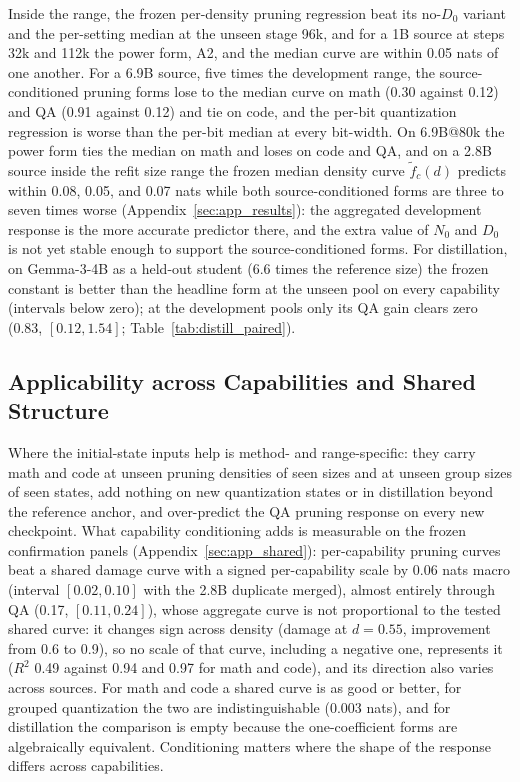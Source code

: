 Inside the range, the frozen per-density pruning regression beat its
no-$D_0$ variant and the per-setting median at the unseen stage 96k,
and for a 1B source at steps 32k and 112k the power form, A2, and the
median curve are within 0.05 nats of one another. For a 6.9B source, five times the development range, the
source-conditioned pruning forms lose to the median curve on math
(0.30 against 0.12) and QA (0.91 against 0.12) and tie on code, and
the per-bit quantization regression is worse than the per-bit median
at every bit-width. On 6.9B@80k the power form ties the median on math and loses on code
and QA, and on a 2.8B source inside the refit size range the frozen
median density curve $\widetilde f_c(d)$ predicts within 0.08, 0.05,
and 0.07 nats while both source-conditioned forms are three to seven
times worse (Appendix~\ref{sec:app_results}): the aggregated
development response is the more accurate predictor there, and the
extra value of $N_0$ and $D_0$ is not yet stable enough to support the
source-conditioned forms. For distillation, on Gemma-3-4B as a held-out student (6.6 times the
reference size) the frozen constant is better than the headline form
at the unseen pool on every capability (intervals below zero); at the development pools only its QA gain clears zero (0.83,
$[0.12,1.54]$; Table~\ref{tab:distill_paired}).

\subsection{Applicability across Capabilities and Shared Structure}
\label{sec:capabilities}

Where the initial-state inputs help is method- and range-specific:
they carry math and code at unseen pruning densities of seen sizes
and at unseen group sizes of seen states, add nothing on new
quantization states or in distillation beyond the reference anchor,
and over-predict the QA pruning response on every new checkpoint. What capability conditioning adds is measurable on the frozen
confirmation panels (Appendix~\ref{sec:app_shared}): per-capability
pruning curves beat a shared damage curve with a signed
per-capability scale by 0.06 nats macro (interval $[0.02,0.10]$ with
the 2.8B duplicate merged), almost entirely through QA (0.17,
$[0.11,0.24]$), whose aggregate curve is not proportional to the tested shared curve:
it changes sign across density (damage at $d=0.55$, improvement from
0.6 to 0.9), so no scale of that curve, including a negative one,
represents it ($R^2$ 0.49 against 0.94 and 0.97 for math and code),
and its direction also varies across sources. For math and
code a shared curve is as good or better, for grouped quantization
the two are indistinguishable (0.003 nats), and for distillation the
comparison is empty because the one-coefficient forms are
algebraically equivalent. Conditioning matters where the shape of the
response differs across capabilities.

